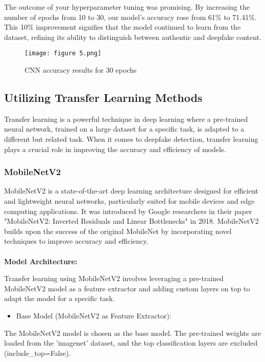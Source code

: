 \documentclass{article}
\begin{document}
The outcome of your hyperparameter tuning was promising. By increasing the number of epochs from 10 to 30, our model's accuracy rose from 61\% to 71.41\%. This 10\% improvement signifies that the model continued to learn from the dataset, refining its ability to distinguish between authentic and deepfake content.


\begin{figure}[h]
    \centering
    \texttt{[image: figure 5.png]}
    \caption{CNN accuracy results for 30 epochs}
    \label{fig:enter-label}
\end{figure}

\subsection{Utilizing Transfer Learning Methods}

Transfer learning is a powerful technique in deep learning where a pre-trained neural network, trained on a large dataset for a specific task, is adapted to a different but related task. When it comes to deepfake detection, transfer learning plays a crucial role in improving the accuracy and efficiency of models.

\subsubsection{MobileNetV2}


MobileNetV2 is a state-of-the-art deep learning architecture designed for efficient and lightweight neural networks, particularly suited for mobile devices and edge computing applications. It was introduced by Google researchers in their paper "MobileNetV2: Inverted Residuals and Linear Bottlenecks" in 2018. MobileNetV2 builds upon the success of the original MobileNet by incorporating novel techniques to improve accuracy and efficiency.
\paragraph{}
\textbf{Model Architecture:}

Transfer learning using MobileNetV2 involves leveraging a pre-trained MobileNetV2 model as a feature extractor and adding custom layers on top to adapt the model for a specific task.


\begin{itemize}
    \item Base Model (MobileNetV2 as Feature Extractor):
\end{itemize}
The MobileNetV2 model is chosen as the base model. The pre-trained weights are loaded from the 'imagenet' dataset, and the top classification layers are excluded (include\_top=False).
\end{document}
